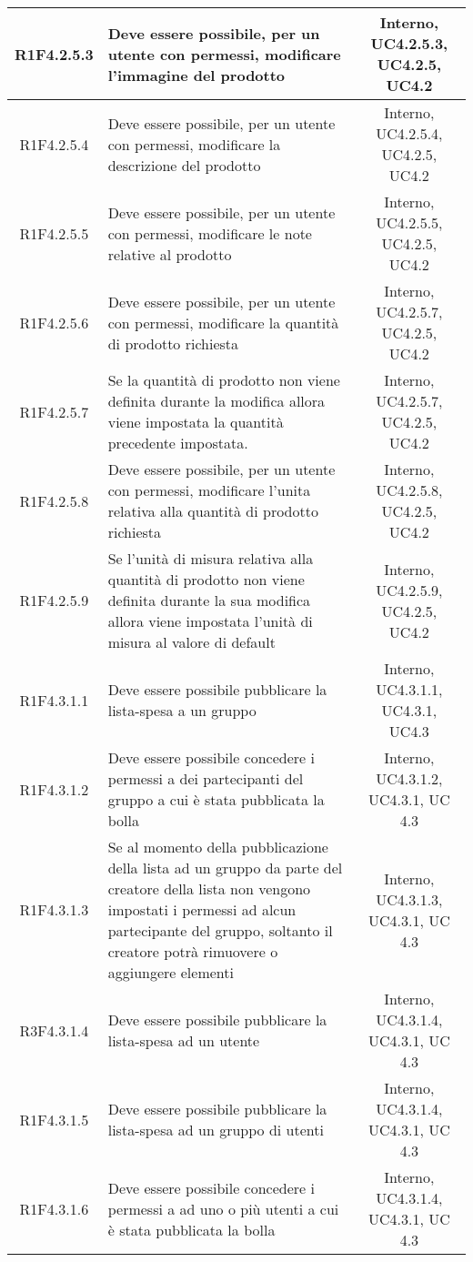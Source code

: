 \begin{longtable}{|c|>{\centering}m{7cm}|c|}
			\hline
			R1F4.2.5.3 & Deve essere possibile, per un utente con permessi, modificare l'immagine del prodotto & Interno, UC4.2.5.3, UC4.2.5, UC4.2 \\
			\hline
			R1F4.2.5.4 & Deve essere possibile, per un utente con permessi, modificare la descrizione del prodotto & Interno, UC4.2.5.4, UC4.2.5, UC4.2 \\
			\hline
			R1F4.2.5.5 & Deve essere possibile, per un utente con permessi, modificare le note relative al prodotto & Interno, UC4.2.5.5, UC4.2.5, UC4.2 \\
			\hline
			R1F4.2.5.6 & Deve essere possibile, per un utente con permessi, modificare la quantità di prodotto richiesta & Interno, UC4.2.5.7, UC4.2.5, UC4.2 \\
			\hline
			R1F4.2.5.7 & Se la quantità di prodotto non viene definita durante la modifica allora viene impostata la quantità precedente impostata. & Interno, UC4.2.5.7, UC4.2.5, UC4.2 \\
			\hline
			R1F4.2.5.8 & Deve essere possibile, per un utente con permessi, modificare l'unita relativa alla quantità di prodotto richiesta & Interno, UC4.2.5.8, UC4.2.5, UC4.2 \\
			\hline
			R1F4.2.5.9 & Se l'unità di misura relativa alla quantità di prodotto non viene definita durante la sua modifica allora viene impostata l'unità di misura al valore di default & Interno, UC4.2.5.9, UC4.2.5, UC4.2 \\
			\hline
			R1F4.3.1.1 & Deve essere possibile pubblicare la lista-spesa a un gruppo & Interno, UC4.3.1.1, UC4.3.1, UC4.3 \\
			\hline
			R1F4.3.1.2 & Deve essere possibile concedere i permessi a dei partecipanti del gruppo a cui è stata pubblicata la bolla & Interno, UC4.3.1.2, UC4.3.1, UC 4.3 \\
			\hline
			R1F4.3.1.3 & Se al momento della pubblicazione della lista ad un gruppo da parte del creatore della lista non vengono impostati i permessi ad alcun partecipante del gruppo, soltanto il creatore potrà rimuovere o aggiungere elementi & Interno, UC4.3.1.3, UC4.3.1, UC 4.3 \\
			\hline
			R3F4.3.1.4 & Deve essere possibile pubblicare la lista-spesa ad un utente & Interno, UC4.3.1.4, UC4.3.1, UC 4.3 \\
			\hline
			R1F4.3.1.5 & Deve essere possibile pubblicare la lista-spesa ad un gruppo di utenti & Interno, UC4.3.1.4, UC4.3.1, UC 4.3 \\
			\hline
			R1F4.3.1.6 & Deve essere possibile concedere i permessi a ad uno o più utenti a cui è stata pubblicata la bolla & Interno, UC4.3.1.4, UC4.3.1, UC 4.3 \\

\end{longtable}
